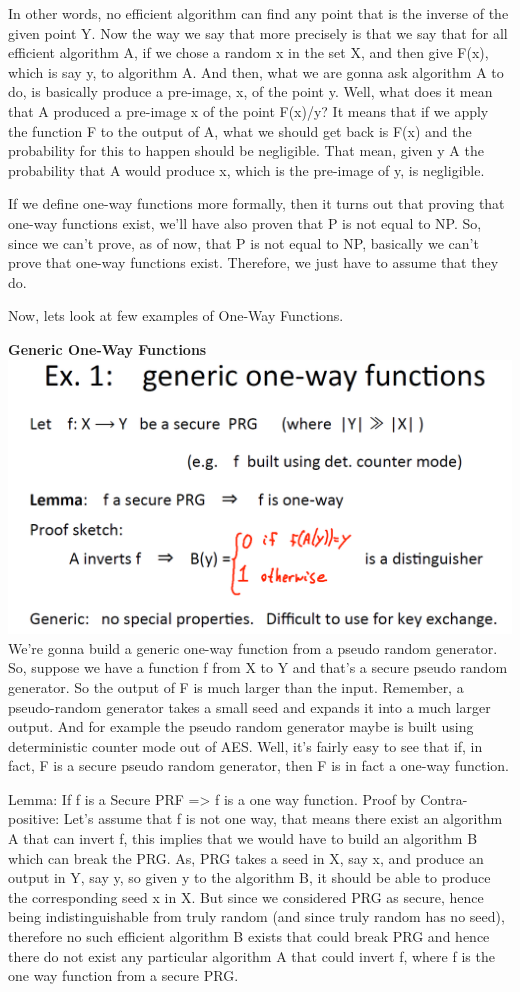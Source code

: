 \documentclass[11pt]{article}
\makeatletter
\def\maxwidth{\ifdim\Gin@nat@width>\linewidth\linewidth
    \else\Gin@nat@width\fi}
\let\Oldincludegraphics\includegraphics
\renewcommand{\includegraphics}[1]{\Oldincludegraphics[width=.8\maxwidth]{#1}}
\makeatother
\begin{document}
In other words, no efficient algorithm can find any point that is the
inverse of the given point Y. Now the way we say that more precisely is
that we say that for all efficient algorithm A, if we chose a random x
in the set X, and then give F(x), which is say y, to algorithm A. And
then, what we are gonna ask algorithm A to do, is basically produce a
pre-image, x, of the point y. Well, what does it mean that A produced a
pre-image x of the point F(x)/y? It means that if we apply the function
F to the output of A, what we should get back is F(x) and the
probability for this to happen should be negligible. That mean, given y
A the probability that A would produce x, which is the pre-image of y,
is negligible.

If we define one-way functions more formally, then it turns out that
proving that one-way functions exist, we'll have also proven that P is
not equal to NP. So, since we can't prove, as of now, that P is not
equal to NP, basically we can't prove that one-way functions exist.
Therefore, we just have to assume that they do.

Now, lets look at few examples of One-Way Functions.

\textbf{Generic One-Way Functions}
\includegraphics{./Images/Generic1WayFxn.png} We're gonna build a
generic one-way function from a pseudo random generator. So, suppose we
have a function f from X to Y and that's a secure pseudo random
generator. So the output of F is much larger than the input. Remember, a
pseudo-random generator takes a small seed and expands it into a much
larger output. And for example the pseudo random generator maybe is
built using deterministic counter mode out of AES. Well, it's fairly
easy to see that if, in fact, F is a secure pseudo random generator,
then F is in fact a one-way function.

Lemma: If f is a Secure PRF =\textgreater{} f is a one way function.
Proof by Contra-positive: Let's assume that f is not one way, that means
there exist an algorithm A that can invert f, this implies that we would
have to build an algorithm B which can break the PRG. As, PRG takes a
seed in X, say x, and produce an output in Y, say y, so given y to the
algorithm B, it should be able to produce the corresponding seed x in X.
But since we considered PRG as secure, hence being indistinguishable
from truly random (and since truly random has no seed), therefore no
such efficient algorithm B exists that could break PRG and hence there
do not exist any particular algorithm A that could invert f, where f is
the one way function from a secure PRG.
\end{document}
